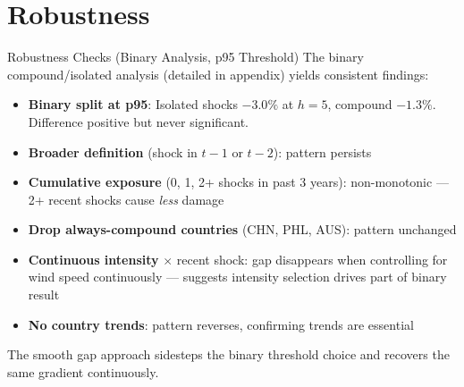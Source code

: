 \documentclass[aspectratio=169,c]{beamer}
\newcommand{\defaultfootline}{%
  \setbeamertemplate{footline}{%
    \hfill{\color{medgray}\scriptsize\insertframenumber\kern14pt}\vskip6pt%
  }%
}
\newcommand{\hideframenumber}{%
  \setbeamertemplate{footline}{}%
  \addtocounter{framenumber}{-1}%
}
\newcommand{\showframenumber}{\defaultfootline}
\begin{document}
\section{Robustness}

{\hideframenumber
\begin{frame}
\sectionpage
\end{frame}
\showframenumber}

\begin{frame}{Robustness Checks (Binary Analysis, p95 Threshold)}
\small
The binary compound/isolated analysis (detailed in appendix) yields consistent findings:
\begin{itemize}
  \item \textbf{Binary split at p95}: Isolated shocks $-3.0\%$ at $h = 5$, compound $-1.3\%$. Difference positive but never significant.
  \item \textbf{Broader definition} (shock in $t{-}1$ or $t{-}2$): pattern persists
  \item \textbf{Cumulative exposure} (0, 1, 2+ shocks in past 3 years): non-monotonic --- 2+ recent shocks cause \emph{less} damage
  \item \textbf{Drop always-compound countries} (CHN, PHL, AUS): pattern unchanged
  \item \textbf{Continuous intensity} $\times$ recent shock: gap disappears when controlling for wind speed continuously --- suggests intensity selection drives part of binary result
  \item \textbf{No country trends}: pattern reverses, confirming trends are essential
\end{itemize}

\medskip
The smooth gap approach sidesteps the binary threshold choice and recovers the same gradient continuously.
\end{frame}
\end{document}
